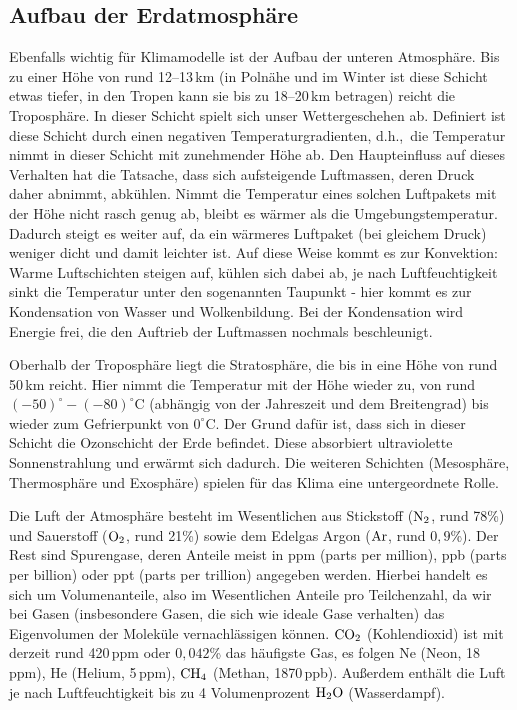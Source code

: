 \subsection{Aufbau der Erdatmosph\"are}

Ebenfalls wichtig f\"ur Klimamodelle ist der Aufbau der unteren Atmosph\"are. Bis zu einer
H\"ohe von rund 12--13\,km (in Poln\"ahe und im Winter ist diese Schicht etwas tiefer, in den
Tropen kann sie bis zu 18--20\,km betragen) reicht die Troposph\"are. In dieser Schicht spielt
sich unser Wettergeschehen ab. Definiert ist diese Schicht durch einen negativen
Temperaturgradienten, d.h.,\ die Temperatur nimmt in dieser Schicht mit zunehmender
H\"ohe ab. Den Haupteinfluss auf dieses Verhalten hat die Tatsache, dass sich aufsteigende Luftmassen,
deren Druck daher abnimmt, abk\"uhlen. Nimmt die Temperatur eines solchen Luftpakets mit der
H\"ohe nicht rasch genug ab, bleibt es w\"armer als die Umgebungstemperatur. Dadurch
steigt es weiter auf, da ein w\"armeres Luftpaket (bei gleichem Druck) weniger dicht und damit
leichter ist. Auf diese Weise
kommt es zur Konvektion: Warme Luftschichten steigen auf, k\"uhlen
sich dabei ab, je nach Luftfeuchtigkeit sinkt die Temperatur unter den sogenannten Taupunkt -
hier kommt es zur Kondensation von Wasser und Wolkenbildung. Bei der Kondensation wird
Energie frei, die den Auftrieb der Luftmassen nochmals beschleunigt. 

Oberhalb der Troposph\"are liegt die Stratosph\"are, die bis in eine H\"ohe von rund 50\,km
reicht. Hier nimmt die Temperatur mit der H\"ohe wieder zu, von rund $(-50)^\circ-(-80)^\circ$C
(abh\"angig von der Jahreszeit und dem Breitengrad)
bis wieder zum Gefrierpunkt von $0^\circ$C. Der Grund daf\"ur ist, dass sich in dieser Schicht
die Ozonschicht der Erde befindet. Diese absorbiert ultraviolette Sonnenstrahlung und erw\"armt
sich dadurch. Die weiteren Schichten (Mesosph\"are, Thermosph\"are
und Exosph\"are) spielen f\"ur das Klima eine untergeordnete Rolle.

Die Luft der Atmosph\"are besteht im Wesentlichen aus Stickstoff (${\rm N}_2$, rund 78\%) und
Sauerstoff (${\rm O}_2$, rund 21\%) sowie dem Edelgas Argon (${\rm Ar}$, rund $0,9$\%). 
Der Rest sind Spurengase, deren Anteile meist in ppm (parts per million), ppb (parts per billion)
oder ppt (parts per trillion) angegeben werden. Hierbei handelt es sich um Volumenanteile, also
im Wesentlichen Anteile pro Teilchenzahl, da wir bei Gasen (insbesondere Gasen, die sich wie
ideale Gase verhalten) das Eigenvolumen der Molek\"ule vernachl\"assigen k\"onnen. 
${\rm CO}_2$ (Kohlendioxid) ist mit derzeit rund 420\,ppm
oder $0,042$\% das h\"aufigste Gas, es folgen Ne (Neon, 18\,ppm), He (Helium, 5\,ppm),
${\rm CH}_4$ (Methan, 1870\,ppb). Au\ss erdem enth\"alt die Luft je nach Luftfeuchtigkeit bis zu 
4 Volumenprozent ${\rm H_2O}$ (Wasserdampf).

